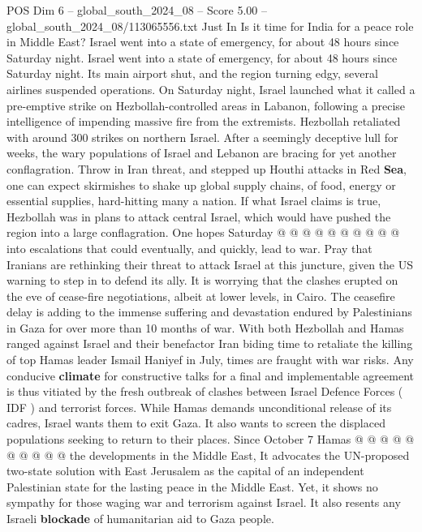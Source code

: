 \begin{textsample}{POS Dim 6 – global\_south\_2024\_08 – Score 5.00 – global\_south\_2024\_08/113065556.txt}  \label{ex:f6_pos_328}
Just In Is it time for India for a peace role in Middle East?
Israel went into a state of emergency, for about 48 hours since Saturday night.
Israel went into a state of emergency, for about 48 hours since Saturday night.
Its main airport shut, and the region turning edgy, several airlines suspended operations.
On Saturday night, Israel launched what it called a pre-emptive strike on Hezbollah-controlled areas in Labanon, following a precise intelligence of impending massive fire from the extremists.
Hezbollah retaliated with around 300 strikes on northern Israel.
After a seemingly deceptive lull for weeks, the wary populations of Israel and Lebanon are bracing for yet another conflagration.
Throw in Iran threat, and stepped up Houthi attacks in Red \textbf{Sea}, one can expect skirmishes to shake up global supply chains, of food, energy or essential supplies, hard-hitting many a nation.
If what Israel claims is true, Hezbollah was in plans to attack central Israel, which would have pushed the region into a large conflagration.
One hopes Saturday @ @ @ @ @ @ @ @ @ @ into escalations that could eventually, and quickly, lead to war.
Pray that Iranians are rethinking their threat to attack Israel at this juncture, given the US warning to step in to defend its ally.
It is worrying that the clashes erupted on the eve of cease-fire negotiations, albeit at lower levels, in Cairo.
The ceasefire delay is adding to the immense suffering and devastation endured by Palestinians in Gaza for over more than 10 months of war.
With both Hezbollah and Hamas ranged against Israel and their benefactor Iran biding time to retaliate the killing of top Hamas leader Ismail Haniyef in July, times are fraught with war risks.
Any conducive \textbf{climate} for constructive talks for a final and implementable agreement is thus vitiated by the fresh outbreak of clashes between Israel Defence Forces ( IDF ) and terrorist forces.
While Hamas demands unconditional release of its cadres, Israel wants them to exit Gaza.
It also wants to screen the displaced populations seeking to return to their places.
Since October 7 Hamas @ @ @ @ @ @ @ @ @ @ the developments in the Middle East, It advocates the UN-proposed two-state solution with East Jerusalem as the capital of an independent Palestinian state for the lasting peace in the Middle East.
Yet, it shows no sympathy for those waging war and terrorism against Israel.
It also resents any Israeli \textbf{blockade} of humanitarian aid to Gaza people.

\end{textsample}
